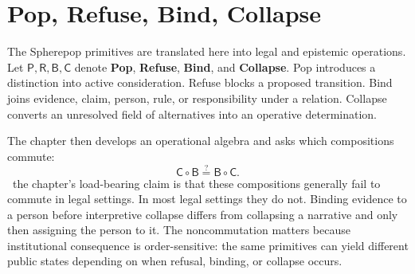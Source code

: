 
\chapter{Pop, Refuse, Bind, Collapse}
\label{ch:ch048}

The Spherepop primitives are translated here into legal and epistemic operations. Let \(\mathsf P,\mathsf R,\mathsf B,\mathsf C\) denote \textbf{Pop}, \textbf{Refuse}, \textbf{Bind}, and \textbf{Collapse}. Pop introduces a distinction into active consideration. Refuse blocks a proposed transition. Bind joins evidence, claim, person, rule, or responsibility under a relation. Collapse converts an unresolved field of alternatives into an operative determination.

The chapter then develops an operational algebra and asks which compositions commute:
\[
\mathsf C\circ\mathsf B
\stackrel{?}{=}
\mathsf B\circ\mathsf C.
\]
\ProposedTheorem\ the chapter's load-bearing claim is that these compositions generally fail to commute in legal settings.
In most legal settings they do not. Binding evidence to a person before interpretive collapse differs from collapsing a narrative and only then assigning the person to it. The noncommutation matters because institutional consequence is order-sensitive: the same primitives can yield different public states depending on when refusal, binding, or collapse occurs.
